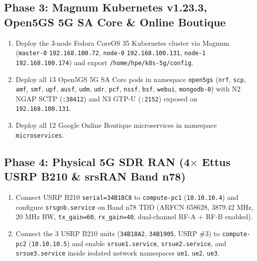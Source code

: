 \documentclass[11pt,a4paper]{article}
\begin{document}
\subsection{Phase 3: Magnum Kubernetes v1.23.3, Open5GS 5G SA Core \& Online Boutique}
\begin{enumerate}
    \item Deploy the 3-node Fedora CoreOS 35 Kubernetes cluster via Magnum (\texttt{master-0} \texttt{192.168.100.72}, \texttt{node-0} \texttt{192.168.100.131}, \texttt{node-1} \texttt{192.168.100.174}) and export \texttt{/home/hpe/k8s-5g/config}.
    \item Deploy all 13 Open5GS 5G SA Core pods in namespace \texttt{open5gs} (\texttt{nrf}, \texttt{scp}, \texttt{amf}, \texttt{smf}, \texttt{upf}, \texttt{ausf}, \texttt{udm}, \texttt{udr}, \texttt{pcf}, \texttt{nssf}, \texttt{bsf}, \texttt{webui}, \texttt{mongodb-0}) with N2 NGAP SCTP (\texttt{:38412}) and N3 GTP-U (\texttt{:2152}) exposed on \texttt{192.168.100.131}.
    \item Deploy all 12 Google Online Boutique microservices in namespace \texttt{microservices}.
\end{enumerate}

\subsection{Phase 4: Physical 5G SDR RAN (4$\times$ Ettus USRP B210 \& srsRAN Band n78)}
\begin{enumerate}
    \item Connect USRP B210 \texttt{serial=34B18C8} to \texttt{compute-pc1} (\texttt{10.10.10.4}) and configure \texttt{srsgnb.service} on Band n78 TDD (ARFCN 658628, 3879.42 MHz, 20 MHz BW, \texttt{tx\_gain=60}, \texttt{rx\_gain=40}, dual-channel RF-A + RF-B enabled).
    \item Connect the 3 USRP B210 units (\texttt{34B18A2}, \texttt{34B1905}, USRP \#3) to \texttt{compute-pc2} (\texttt{10.10.10.5}) and enable \texttt{srsue1.service}, \texttt{srsue2.service}, and \texttt{srsue3.service} inside isolated network namespaces \texttt{ue1}, \texttt{ue2}, \texttt{ue3}.
\end{enumerate}
\end{document}
